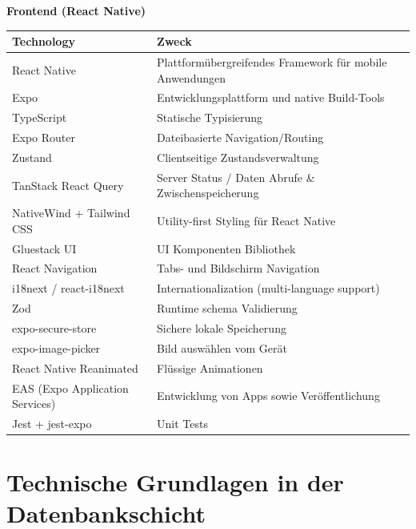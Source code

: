 \vspace{6em}

\textbf{Frontend (React Native)}

\begin{tabular}{|p{5cm}|p{}|}
\hline
\textbf{Technology} & \textbf{Zweck} \\
\hline
React Native & Plattformübergreifendes Framework für mobile Anwendungen \\
\hline
Expo & Entwicklungsplattform und native Build-Tools \\
\hline
TypeScript & Statische Typisierung \\
\hline
Expo Router & Dateibasierte Navigation/Routing \\
\hline
Zustand & Clientseitige Zustandsverwaltung \\
\hline
TanStack React Query & Server Status / Daten Abrufe \& Zwischenspeicherung \\
\hline
NativeWind + Tailwind CSS & Utility-first Styling für React Native \\
\hline
Gluestack UI & UI Komponenten Bibliothek \\
\hline
React Navigation & Tabs- und Bildschirm Navigation \\
\hline
i18next / react-i18next & Internationalization (multi-language support) \\
\hline
Zod & Runtime schema Validierung \\
\hline
expo-secure-store & Sichere lokale Speicherung\\
\hline
expo-image-picker & Bild auswählen vom Gerät \\
\hline
React Native Reanimated & Flüssige Animationen \\
\hline
EAS (Expo Application Services) & Entwicklung von Apps sowie Veröffentlichung \\
\hline
Jest + jest-expo & Unit Tests \\
\hline
\end{tabular}

\section{Technische Grundlagen in der Datenbankschicht}

    